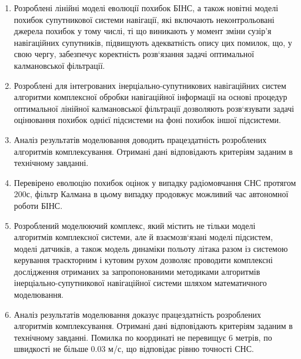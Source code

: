 \begin{enumerate}
\item  Розроблені лінійні моделі еволюції похибок БІНС, а також новітні моделі похибок супутникової системи навігації, які включають неконтрольовані джерела похибок у тому числі, ті що виникають у момент зміни сузір'я навігаційних супутників, підвищують адекватність опису цих помилок, що, у свою чергу, забезпечує коректність розв`язання задачі оптимальної калмановської фільтрації. 

\item  Розроблені для інтегрованих інерціально-супутникових навігаційних систем алгоритми комплексної обробки навігаційної інформації на основі процедур оптимальної лінійної калмановської фільтрації дозволяють розв`язувати задачі оцінювання похибок однієї підсистеми на фоні похибок іншої підсистеми.

\item  Аналіз результатів моделювання доводить працездатність розроблених алгоритмів комплексування. Отримані дані відповідають критеріям заданим в технічному завданні.
\item  Перевірено еволюцію похибок оцінок у випадку радіомовчання СНС протягом 200с, фільтр Калмана в цьому випадку продовжує можливий час автономної роботи БІНС.
\item  Розроблений моделюючий комплекс, який містить не тільки моделі алгоритмів комплексної системи, але й взаємозв`язані моделі підсистем, моделі датчиків, а також модель динаміки польоту літака разом із системою керування траєкторним і кутовим рухом дозволяє проводити комплексні дослідження отриманих за запропонованими методиками алгоритмів інерціально-супутникової навігаційної системи шляхом математичного моделювання. 

\item  Аналіз результатів моделювання доказує працездатність розроблених алгоритмів комплексування. Отримані дані відповідають критеріям заданим в технічному завданні. Помилка по координаті не перевищує 6 метрів, по швидкості не більше 0.03 м/с, що відповідає рівню точності СНС.
\end{enumerate}
